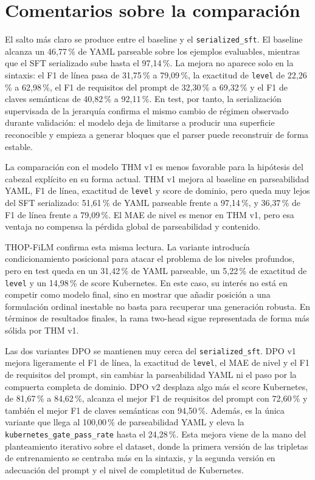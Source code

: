 \section{Comentarios sobre la comparación}
\label{sec:ch9_comparison}

El salto más claro se produce entre el baseline y el \texttt{serialized\_sft}. El baseline alcanza un 46{,}77\,\% de YAML parseable sobre los ejemplos evaluables,
mientras que el SFT serializado sube hasta el 97{,}14\,\%. La mejora no aparece solo en la sintaxis: el F1 de línea pasa de 31{,}75\,\% a 79{,}09\,\%, la exactitud
de \texttt{level} de 22{,}26\,\% a 62{,}98\,\%, el F1 de requisitos del prompt de 32{,}30\,\% a 69{,}32\,\% y el F1 de claves semánticas de 40{,}82\,\% a 92{,}11\,\%.
En test, por tanto, la serialización supervisada de la jerarquía confirma el mismo cambio de régimen observado durante validación: el modelo deja de limitarse a
producir una superficie reconocible y empieza a generar bloques que el parser puede reconstruir de forma estable.

La comparación con el modelo THM v1 es menos favorable para la hipótesis del cabezal explícito en su forma actual. THM v1 mejora al baseline en parseabilidad
YAML, F1 de línea, exactitud de \texttt{level} y score de dominio, pero queda muy lejos del SFT serializado: 51{,}61\,\% de YAML parseable frente a 97{,}14\,\%, y
36{,}37\,\% de F1 de línea frente a 79{,}09\,\%. El MAE de nivel es menor en THM v1, pero esa ventaja no compensa la pérdida global de parseabilidad y contenido.

THOP-FiLM confirma esta misma lectura. La variante introducía condicionamiento posicional para atacar el problema de los niveles profundos,
pero en test queda en un 31{,}42\,\% de YAML parseable, un 5{,}22\,\% de exactitud de \texttt{level} y un 14{,}98\,\% de score Kubernetes. En este caso, su interés no está en
competir como modelo final, sino en mostrar que añadir posición a una formulación ordinal inestable no basta para recuperar una generación robusta. En términos
de resultados finales, la rama two-head sigue representada de forma más sólida por THM v1.

Las dos variantes DPO se mantienen muy cerca del \texttt{serialized\_sft}. DPO v1 mejora ligeramente el F1 de línea, la exactitud de \texttt{level}, el MAE de nivel
y el F1 de requisitos del prompt, sin cambiar la parseabilidad YAML ni el paso por la compuerta completa de dominio. DPO v2 desplaza algo más el score Kubernetes,
de 81{,}67\,\% a 84{,}62\,\%, alcanza el mejor F1 de requisitos del prompt con 72{,}60\,\% y también el mejor F1 de claves semánticas con 94{,}50\,\%. Además, es
la única variante que llega al 100{,}00\,\% de parseabilidad YAML y eleva la \texttt{kubernetes\_gate\_pass\_rate} hasta el 24{,}28\,\%. Esta mejora viene de la mano
del planteamiento iterativo sobre el dataset, donde la primera versión de las tripletas de entrenamiento se centraba más en la sintaxis, y la segunda versión en
adecuación del prompt y el nivel de completitud de Kubernetes.

